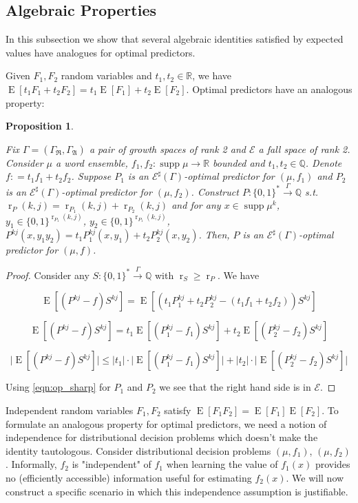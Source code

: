 \documentclass{article}
\theoremstyle{definition}
\theoremstyle{plain}
\newtheorem{proposition}{Proposition}[section]
\newcommand{\Words}{{\{ 0, 1 \}^*}}
\newcommand{\WordsLen}[1]{{\{ 0, 1 \}^{#1}}}
\DeclareMathOperator{\Supp}{supp}
\DeclareMathOperator{\E}{E}
\DeclareMathOperator{\R}{r}
\newcommand{\Rats}{\mathbb{Q}}
\newcommand{\Reals}{\mathbb{R}}
\newcommand{\Abs}[1]{\lvert #1 \rvert}
\begin{document}
\subsection{Algebraic Properties}

In this subsection we show that several algebraic identities satisfied by expected values have analogues for optimal predictors.

Given $F_1,F_2$ random variables and $t_1,t_2 \in \Reals$, we have ${\E[t_1 F_1 + t_2 F_2] = t_1 \E[F_1] + t_2 \E[F_2]}$. Optimal predictors have an analogous property:

\begin{proposition}
\label{prp:linearity}

Fix $\Gamma=(\Gamma_{\mathfrak{R}},\Gamma_{\mathfrak{A}})$ a pair of growth spaces of rank 2 and $\mathcal{E}$ a fall space of rank 2. Consider $\mu$ a word ensemble, $f_1,f_2: \Supp \mu \rightarrow \Reals$ bounded and $t_1,t_2 \in \Rats$. Denote $f: = t_1 f_1 + t_2 f_2$. Suppose $P_1$ is an $\mathcal{E}^\sharp(\Gamma)$-optimal predictor for $(\mu,f_1)$ and $P_2$ is an $\mathcal{E}^\sharp(\Gamma)$-optimal predictor for $(\mu,f_2)$. Construct $P: \Words \xrightarrow{\Gamma} \Rats$ s.t. $\R_P(k,j) = \R_{P_1}(k,j) + \R_{P_2}(k,j)$ and for any $x \in \Supp \mu^k$, $y_1 \in \WordsLen{\R_{P_1}(k,j)}$, $y_2 \in \WordsLen{\R_{P_1}(k,j)}$, $P^{kj}(x,y_1 y_2)=t_1 P_1^{kj}(x,y_1) + t_2 P_2^{kj}(x, y_2)$. Then, $P$ is an $\mathcal{E}^\sharp(\Gamma)$-optimal predictor for $(\mu, f)$.

\end{proposition}

\begin{proof}

Consider any $S: \Words \xrightarrow{\Gamma} \Rats$ with $\R_S \geq \R_P$. We have

$$\E[(P^{kj} - f)S^{kj}] = \E[(t_1 P_1^{kj} + t_2 P_2^{kj} - (t_1 f_1 + t_2 f_2))S^{kj}]$$

$$\E[(P^{kj} - f)S^{kj}] = t_1 \E[(P_1^{kj} - f_1)S^{kj}] + t_2 \E[(P_2^{kj} - f_2)S^{kj}]$$

$$\Abs{\E[(P^{kj} - f)S^{kj}]} \leq \Abs{t_1} \cdot \Abs{\E[(P_1^{kj} - f_1)S^{kj}]} + \Abs{t_2} \cdot \Abs{\E[(P_2^{kj} - f_2)S^{kj}]}$$

Using \ref{eqn:op_sharp} for $P_1$ and $P_2$ we see that the right hand side is in $\mathcal{E}$.

\end{proof}

Independent random variables $F_1, F_2$ satisfy $\E[F_1 F_2] = \E[F_1] \E[F_2]$. To formulate an analogous property for optimal predictors, we need a notion of independence for distributional decision problems which doesn't make the identity tautologous. Consider distributional decision problems $(\mu, f_1)$, $(\mu, f_2)$. Informally, $f_2$ is "independent" of $f_1$ when learning the value of $f_1(x)$ provides no (efficiently accessible) information useful for estimating $f_2(x)$. We will now construct a specific scenario in which this independence assumption is justifiable.
\end{document}
